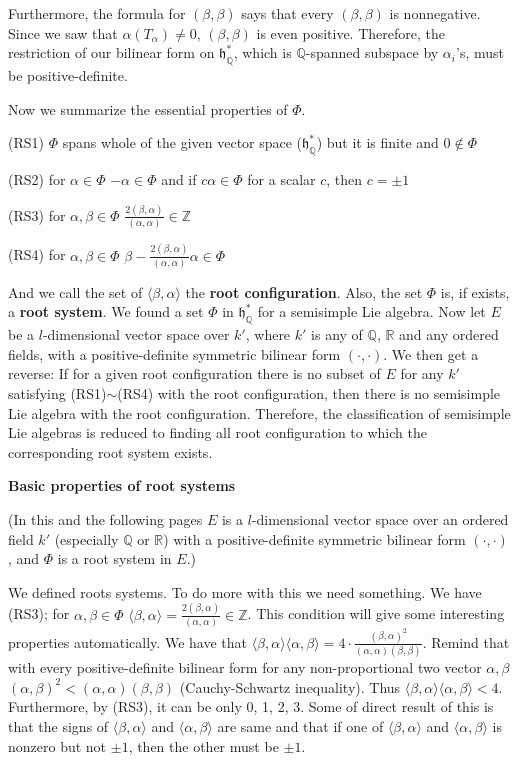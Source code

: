 \documentclass{article}
\newcommand{\InZ}{\mathbb{Z}}
\newcommand{\RaQ}{\mathbb{Q}}
\newcommand{\ReR}{\mathbb{R}}
\newcommand{\lie}[1]{\mathfrak{#1}}
\begin{document}
Furthermore, the formula for $(\beta, \beta)$ says that every $(\beta, \beta)$ is nonnegative.
Since we saw that $\alpha(T_\alpha) \ne 0$, $(\beta, \beta)$ is even positive.
Therefore, the restriction of our bilinear form on $\lie{h}^*_\RaQ$, which is $\RaQ$-spanned subspace by $\alpha_i$'s, must be positive-definite.

Now we summarize the essential properties of $\Phi$.

(RS1) $\Phi$ spans whole of the given vector space ($\lie{h}^*_\RaQ$) but it is finite and $0 \notin \Phi$

(RS2) for $\alpha \in \Phi$ $-\alpha \in \Phi$ and if $c\alpha \in \Phi$ for a scalar $c$, then $c = \pm 1$

(RS3) for $ \alpha, \beta \in \Phi$ $\frac{2(\beta, \alpha)}{(\alpha, \alpha)} \in \InZ$

(RS4) for $ \alpha, \beta \in \Phi$ $\beta - \frac{2(\beta, \alpha)}{(\alpha, \alpha)} \alpha \in \Phi$

And we call the set of $\langle \beta, \alpha \rangle$ the \textbf{root configuration}.
Also, the set $\Phi$ is, if exists, a \textbf{root system}.
We found a set $\Phi$ in $\lie{h}^*_\RaQ$ for a semisimple Lie algebra.
Now let $E$ be a $l$-dimensional vector space over $k'$, where $k'$ is any of $\RaQ$, $\ReR$ and any ordered fields, with a positive-definite symmetric bilinear form $(\cdot, \cdot)$.
We then get a reverse: If for a given root configuration there is no subset of $E$ for any $k'$ satisfying (RS1)$\sim$(RS4) with the root configuration, then there is no semisimple Lie algebra with the root configuration.
Therefore, the classification of semisimple Lie algebras is reduced to finding all root configuration to which the corresponding root system exists.

\newpage

\textbf{Basic properties of root systems}

(In this and the following pages $E$ is a $l$-dimensional vector space over an ordered field $k'$ (especially $\RaQ$ or $\ReR$) with a positive-definite symmetric bilinear form $(\cdot, \cdot)$, and $\Phi$ is a root system in $E$.)

We defined roots systems.
To do more with this we need something.
We have (RS3); for $\alpha, \beta \in \Phi$ $\langle \beta, \alpha \rangle = \frac{2(\beta, \alpha)}{(\alpha, \alpha)} \in \InZ$.
This condition will give some interesting properties automatically.
We have that $\langle \beta, \alpha \rangle \langle \alpha, \beta \rangle = 4 \cdot \frac{(\beta, \alpha)^2}{(\alpha, \alpha) (\beta, \beta)}$.
Remind that with every positive-definite bilinear form for any non-proportional two vector $\alpha, \beta$ $(\alpha, \beta)^2 < (\alpha, \alpha) (\beta, \beta)$ (Cauchy-Schwartz inequality).
Thus $\langle \beta, \alpha \rangle \langle \alpha, \beta \rangle < 4$.
Furthermore, by (RS3), it can be only 0, 1, 2, 3.
Some of direct result of this is that the signs of $\langle \beta, \alpha \rangle$ and $\langle \alpha, \beta \rangle$ are same and that if one of $\langle \beta, \alpha \rangle$ and $\langle \alpha, \beta \rangle$ is nonzero but not $\pm 1$, then the other must be $\pm 1$.
\end{document}
